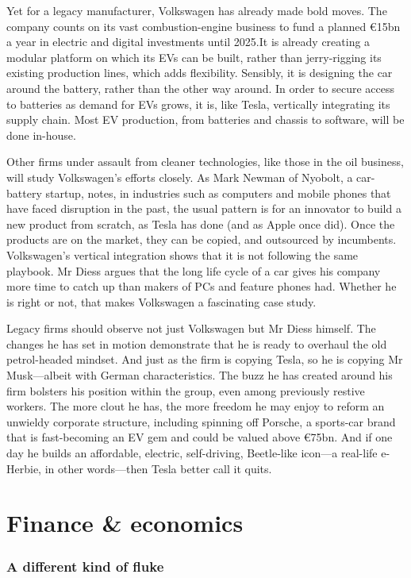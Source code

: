\documentclass{article}
\begin{document}
Yet for a legacy manufacturer, Volkswagen has already made bold moves. The company counts on its vast combustion-engine business to fund a planned €15bn a year in electric and digital investments until 2025.It is already creating a modular platform on which its EVs can be built, rather than jerry-rigging its existing production lines, which adds flexibility. Sensibly, it is designing the car around the battery, rather than the other way around. In order to secure access to batteries as demand for EVs grows, it is, like Tesla, vertically integrating its supply chain. Most EV production, from batteries and chassis to software, will be done in-house. 

Other firms under assault from cleaner technologies, like those in the oil business, will study Volkswagen's efforts closely. As Mark Newman of Nyobolt, a car-battery startup, notes, in industries such as computers and mobile phones that have faced disruption in the past, the usual pattern is for an innovator to build a new product from scratch, as Tesla has done (and as Apple once did). Once the products are on the market, they can be copied, and outsourced by incumbents. Volkswagen's vertical integration shows that it is not following the same playbook. Mr Diess argues that the long life cycle of a car gives his company more time to catch up than makers of PCs and feature phones had. Whether he is right or not, that makes Volkswagen a fascinating case study. 

Legacy firms should observe not just Volkswagen but Mr Diess himself. The changes he has set in motion demonstrate that he is ready to overhaul the old petrol-headed mindset. And just as the firm is copying Tesla, so he is copying Mr Musk---albeit with German characteristics. The buzz he has created around his firm bolsters his position within the group, even among previously restive workers. The more clout he has, the more freedom he may enjoy to reform an unwieldy corporate structure, including spinning off Porsche, a sports-car brand that is fast-becoming an EV gem and could be valued above €75bn. And if one day he builds an affordable, electric, self-driving, Beetle-like icon---a real-life e-Herbie, in other words---then Tesla better call it quits. {} 
\clearpage
\section{Finance \& economics }
\subsubsection{A different kind of fluke }
\end{document}
